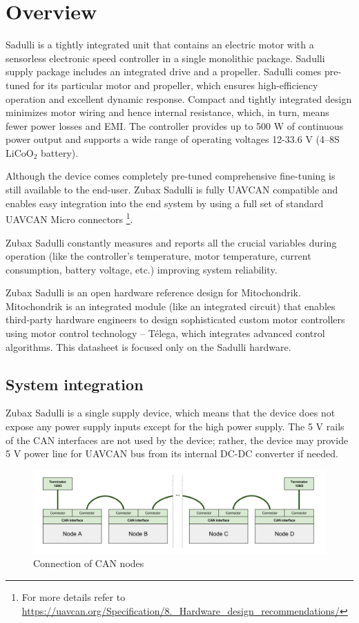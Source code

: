 \chapter{Overview}

Sadulli is a tightly integrated unit that contains an electric motor with a sensorless electronic speed controller 
in a single monolithic package. Sadulli supply package includes an integrated drive and a propeller. 
Sadulli comes pre-tuned for its particular motor and propeller, 
which ensures high-efficiency operation and excellent dynamic response. 
Compact and tightly integrated design minimizes motor wiring and hence internal resistance, which, in turn, 
means fewer power losses and EMI.
The controller provides up to 500 W of continuous power output and supports a wide range of operating voltages 
12-33.6 V (4–8S $\text{LiCoO}_\text{2}$ battery).

Although the device comes completely pre-tuned comprehensive fine-tuning is still available to the end-user.
Zubax Sadulli is fully UAVCAN compatible and enables easy integration into the end system by 
using a full set of standard UAVCAN Micro connectors
\footnote{For more details refer to \url{https://uavcan.org/Specification/8._Hardware_design_recommendations/}}.

Zubax Sadulli constantly measures and reports all the crucial variables during operation 
(like the controller’s temperature, motor temperature, current consumption, battery voltage, etc.) 
improving system reliability.

Zubax Sadulli is an open hardware reference design for Mitochondrik.
Mitochondrik is an integrated module (like an integrated circuit) that enables third-party hardware engineers 
to design sophisticated custom motor controllers using motor control technology – T\'elega, 
which integrates advanced control algorithms. This datasheet is focused only on the Sadulli hardware.

\section{System integration}
Zubax Sadulli is a single supply device, which means that the device does not expose any power supply inputs 
except for the high power supply. The 5 V rails of the CAN interfaces are not used by the device; 
rather, the device may provide 5 V power line for UAVCAN bus from its internal DC-DC converter if needed.

\begin{figure}[h]
    \centering
    \includegraphics[width=1\textwidth]{figures/can_integration.png}
    \caption{Connection of CAN nodes}
\end{figure}


